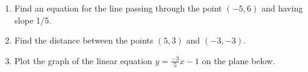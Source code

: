 \documentclass{article}
\begin{document}
\HomeworkTitle[class={College Algebra}, number={3}, name={Lines and Circles}]

\begin{enumerate}
\item Find an equation for the line passing through the point $(-5, 6)$ and having slope 1/5. \vspace{5cm}

\item Find the distance between the points $(5, 3)$ and $(-3, -3)$. \vspace{5cm}

\item Plot the graph of the linear equation $y = \frac{-3}{5} x - 1$ on the plane below.\begin{center}
\CartesianPlane[h=7,w=7,axes=yes]
\end{center}

  
\end{enumerate}
\end{document}
